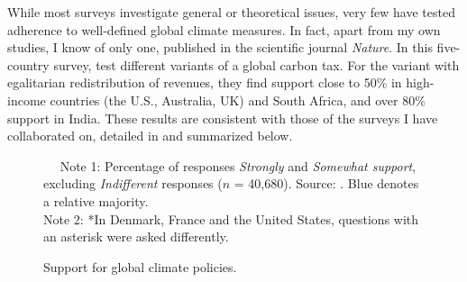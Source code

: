 \documentclass[a5paper,english,openany]{memoir}
\begin{document}
While most surveys investigate general or theoretical issues, very few have tested adherence to well-defined global climate measures. In fact, apart from my own studies, I know of only one, published in the scientific journal \textit{Nature}. In this five-country survey, \citet{carattini_how_2019} test different variants of a global carbon tax. For the variant with egalitarian redistribution of revenues, they find support close to 50\% in high-income countries (the U.S., Australia, UK) and South Africa, and over 80\% support in India. These results are consistent with those of the surveys I have collaborated on, detailed in \citet{fabre_international_2023} and summarized below. 

\begin{figure}[b!] %
  \caption[Support for global climate policies]{Support for global climate policies.} 
  \label{fig:oecd} %
  {\footnotesize $\quad$ Note 1: Percentage of responses \textit{Strongly} and \textit{Somewhat support}, excluding \textit{Indifferent} responses ($n$ = 40,680). Source: \citet{fabre_international_2023}. %
  Blue denotes a relative majority. %
  \\ Note 2: *In Denmark, France and the United States, questions with an asterisk were asked differently. %
  } 
\end{figure}
\end{document}
